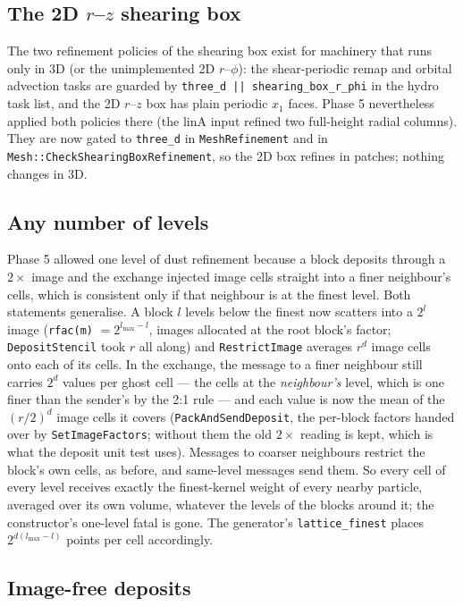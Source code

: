 \documentclass[11pt]{article}
\newcommand{\code}[1]{\texttt{#1}}
\newcommand{\fn}[1]{\texttt{\small #1}}
\begin{document}
\subsection{The 2D $r$--$z$ shearing box}

The two refinement policies of the shearing box exist for machinery that runs only in
3D (or the unimplemented 2D $r$--$\phi$): the shear-periodic remap and orbital advection
tasks are guarded by \code{three\_d || shearing\_box\_r\_phi} in the hydro task list, and
the 2D $r$--$z$ box has plain periodic $x_1$ faces. Phase 5 nevertheless applied both
policies there (the linA input refined two full-height radial columns). They are now
gated to \code{three\_d} in \code{MeshRefinement} and in
\fn{Mesh::CheckShearingBoxRefinement}, so the 2D box refines in patches; nothing changes
in 3D.

\subsection{Any number of levels}
\label{sec:phase6-levels}

Phase 5 allowed one level of dust refinement because a block deposits through a
$2\times$ image and the exchange injected image cells straight into a finer neighbour's
cells, which is consistent only if that neighbour is at the finest level. Both statements
generalise. A block $l$ levels below the finest now scatters into a $2^l$ image
(\code{rfac(m)} $= 2^{l_{\max}-l}$, images allocated at the root block's factor;
\fn{DepositStencil} took $r$ all along) and \fn{RestrictImage} averages $r^d$ image cells
onto each of its cells. In the exchange, the message to a finer neighbour still carries
$2^d$ values per ghost cell --- the cells at the \emph{neighbour's} level, which is one
finer than the sender's by the 2:1 rule --- and each value is now the mean of the
$(r/2)^d$ image cells it covers (\fn{PackAndSendDeposit}, the per-block factors handed
over by \fn{SetImageFactors}; without them the old $2\times$ reading is kept, which is
what the deposit unit test uses). Messages to coarser neighbours restrict the block's own
cells, as before, and same-level messages send them. So every cell of every level
receives exactly the finest-kernel weight of every nearby particle, averaged over its
own volume, whatever the levels of the blocks around it; the constructor's one-level
fatal is gone. The generator's \code{lattice\_finest} places $2^{d(l_{\max}-l)}$ points
per cell accordingly.

\subsection{Image-free deposits}
\label{sec:imagefree}
\end{document}
